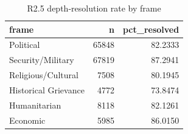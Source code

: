 \begin{table}
\caption{R2.5 depth-resolution rate by frame}
\label{tab:r1r2_depth_resolution_by_frame}
\begin{tabular}{lrr}
\toprule
frame & n & pct\_resolved \\
\midrule
Political & 65848 & 82.2333 \\
Security/Military & 67819 & 87.2941 \\
Religious/Cultural & 7508 & 80.1945 \\
Historical Grievance & 4772 & 73.8474 \\
Humanitarian & 8118 & 82.1261 \\
Economic & 5985 & 86.0150 \\
\bottomrule
\end{tabular}
\end{table}
